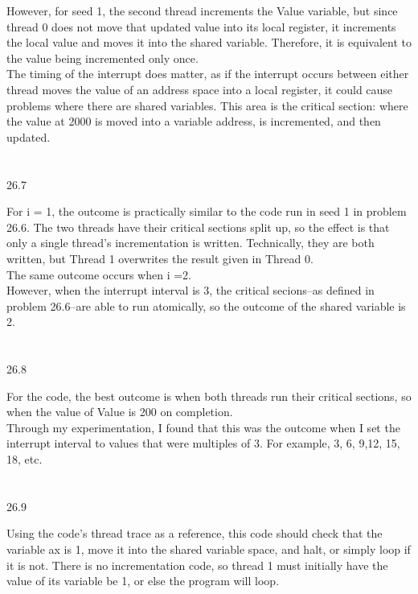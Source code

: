 \documentclass[12pt, a4paper]{article}
\begin{document}
	However, for seed 1, the second thread increments the Value variable, but since thread 0 does not move that updated value into its local register, it increments the local value and moves it into the shared variable. Therefore, it is equivalent to the value being incremented only once. \\
	
	The timing of the interrupt does matter, as if the interrupt occurs between either thread moves the value of an address space into a local register, it could cause problems where there are shared variables. This area is the critical section: where the value at 2000 is moved into a variable address, is incremented, and then updated.  \\ \\ \\
	
	

26.7

	For i = 1, the outcome is practically similar to the code run in seed 1 in problem 26.6. The two threads have their critical sections split up, so the effect is that only a single thread's incrementation is written.  Technically, they are both written, but Thread 1 overwrites the result given in Thread 0. \\
	
	The same outcome occurs when i =2.\\
	
	However, when the interrupt interval is 3, the critical secions--as defined in problem 26.6--are able to run atomically, so the outcome of the shared variable is 2. \\ \\ \\

26.8

	For the code, the best outcome is when both threads run their critical sections, so when the value of Value is 200 on completion.\\
	
	Through my experimentation, I found that this was the outcome when I set the interrupt interval to values that were multiples of 3. For example, 3, 6, 9,12, 15, 18, etc. \\ \\ \\

26.9

	Using the code's thread trace as a reference, this code should check that the variable ax is 1, move it into the shared variable space, and halt, or simply loop if it is not. There is no incrementation code, so thread 1 must initially have the value of its variable be 1, or else the program will loop. \\
	
\end{document}
